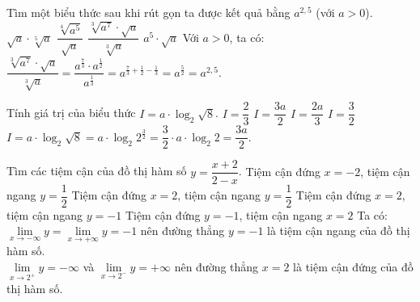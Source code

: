 \begin{ex}%
 Tìm một biểu thức sau khi rút gọn ta được kết quả bằng $a^{2{,}5}$ (với $a > 0$).
 \choice
  {$\sqrt{a} \cdot \sqrt[5]{a}$}
  {$\dfrac{\sqrt[4]{a^5}}{\sqrt{a}}$}
  {\True $\dfrac{\sqrt[3]{a^7} \cdot \sqrt{a}}{\sqrt[3]{a}}$}
  {$a^5 \cdot \sqrt{a}$}
 \loigiai
  {
  Với $a>0$, ta có:\\
  $\dfrac{\sqrt[3]{a^7} \cdot \sqrt{a}}{\sqrt[3]{a}} = \dfrac{a^{\frac{7}{3}} \cdot a^{\frac{1}{2}}}{a^{\frac{1}{3}}} = a^{\frac{7}{3} + \frac{1}{2} - \frac{1}{3}} = a^{\frac{5}{2}} = a^{2,5}$.
  }
\end{ex}


\begin{ex}%
 Tính giá trị của biểu thức $I = a \cdot \log_2 \sqrt{8}$.
 \choice
  {$I = \dfrac{2}{3}$}
  {\True $I = \dfrac{3a}{2}$}
  {$I = \dfrac{2a}{3}$}
  {$I = \dfrac{3}{2}$}
 \loigiai
  {
  $I = a \cdot \log_2 \sqrt{8} = a \cdot \log _2 2^{\frac{3}{2}} = \dfrac{3}{2} \cdot a \cdot \log_2 2 = \dfrac{3a}{2}$.
  }
\end{ex}


\begin{ex}%
 Tìm các tiệm cận của đồ thị hàm số $y = \dfrac{x+2}{2-x}$.
 \choice
  {Tiệm cận đứng $x=-2$, tiệm cận ngang $y=\dfrac{1}{2}$}
  {Tiệm cận đứng $x=2$, tiệm cận ngang $y=\dfrac{1}{2}$}
  {\True Tiệm cận đứng $x=2$, tiệm cận ngang $y=-1$}
  {Tiệm cận đứng $y=-1$, tiệm cận ngang $x=2$}
 \loigiai
  {
  Ta có:\\
  $\lim\limits_{x \to -\infty} y = \lim\limits_{x \to +\infty} y = -1$ nên đường thẳng $y = -1$ là tiệm cận ngang của đồ thị hàm số.\\
  $\lim\limits_{x \to 2^+} y = -\infty$ và $\lim\limits_{x \to 2^-} y = +\infty$ nên đường thẳng $x = 2$ là tiệm cận đứng của đồ thị hàm số.
  }
\end{ex}


